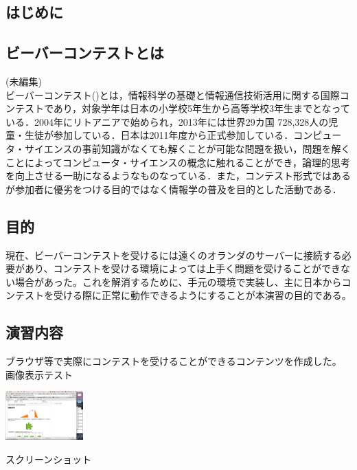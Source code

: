 \documentclass[a4paper]{jarticle}
\makeatletter
\newenvironment{figurehere}
  {\def\@captype{figure}}
  {}
\makeatother
\begin{document}
\maketitle
\begin{multicols}{2}
\setcounter{page}{27}

\section{はじめに}

\subsection{ビーバーコンテストとは}
(未編集)\\
ビーバーコンテスト(\cite{bebras-contest, bebras-pdf})とは，情報科学の基礎と情報通信技術活用に関する国際コンテストであり，対象学年は日本の小学校5年生から高等学校3年生までとなっている．2004年にリトアニアで始められ，2013年には世界29カ国 728,328人の児童・生徒が参加している．日本は2011年度から正式参加している．コンピュータ・サイエンスの事前知識がなくても解くことが可能な問題を扱い，問題を解くことによってコンピュータ・サイエンスの概念に触れることができ，論理的思考を向上させる一助になるようなものなっている．また，コンテスト形式ではあるが参加者に優劣をつける目的ではなく情報学の普及を目的とした活動である．

\subsection{目的}
現在、ビーバーコンテストを受けるには遠くのオランダのサーバーに接続する必要があり、コンテストを受ける環境によっては上手く問題を受けることができない場合があった。これを解消するために、手元の環境で実装し、主に日本からコンテストを受ける際に正常に動作できるようにすることが本演習の目的である。

\subsection{演習内容}
ブラウザ等で実際にコンテストを受けることができるコンテンツを作成した。\\
画像表示テスト\\
\begin{figurehere}
\begin{center}
	\includegraphics[bb=200 0 620 650,width=3cm]{img/bebras-templete-test.jpg}\\
\end{center}
	\caption{スクリーンショット}\label{fig:1}
\end{figurehere}


\end{multicols}
\end{document}
